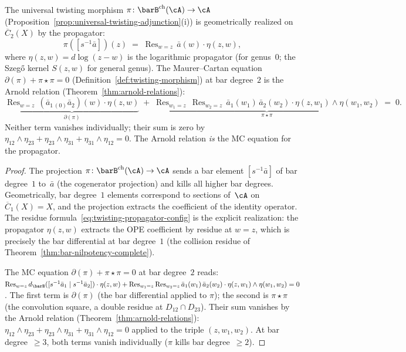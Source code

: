 \begin{proposition}
\label{prop:twisting-morphism-propagator}
The universal twisting morphism
$\pi\colon \barB^{\mathrm{ch}}(\cA) \to \cA$
\textup{(}Proposition~\textup{\ref{prop:universal-twisting-adjunction}(i))}
is geometrically realized on~$\overline{C}_2(X)$ by the propagator:
\begin{equation}\label{eq:twisting-propagator-config}
\pi([s^{-1}\bar{a}])(z)
\;=\;
\operatorname{Res}_{w=z}\, \bar{a}(w) \cdot \eta(z, w),
\end{equation}
where $\eta(z,w) = d\log(z - w)$ is the logarithmic propagator
\textup{(}for genus~$0$; the Szeg\H{o} kernel $S(z,w)$ for
general genus\textup{)}.  The Maurer--Cartan equation
$\partial(\pi) + \pi \star \pi = 0$
\textup{(}Definition~\textup{\ref{def:twisting-morphism})} at bar
degree~$2$ is the Arnold relation
\textup{(}Theorem~\textup{\ref{thm:arnold-relations})}:
\[
\underbrace{\operatorname{Res}_{w=z}\,
(\bar{a}_{1\,(0)}\bar{a}_2)(w) \cdot \eta(z,w)}_{\partial(\pi)}
\;+\;
\underbrace{\operatorname{Res}_{w_1=z}\,
\operatorname{Res}_{w_2=z}\,
\bar{a}_1(w_1)\, \bar{a}_2(w_2)
\cdot \eta(z,w_1) \wedge \eta(w_1,w_2)}_{\pi \star \pi}
\;=\; 0.
\]
Neither term vanishes individually; their sum is zero by
$\eta_{12} \wedge \eta_{23} + \eta_{23} \wedge \eta_{31}
+ \eta_{31} \wedge \eta_{12} = 0$.
The Arnold relation \emph{is} the MC equation for the propagator.
\end{proposition}

\begin{proof}
The projection $\pi\colon \barB^{\mathrm{ch}}(\cA) \to \cA$ sends
a bar element $[s^{-1}\bar{a}]$ of bar degree~$1$ to~$\bar{a}$
(the cogenerator projection) and kills all higher bar degrees.
Geometrically, bar degree~$1$ elements correspond to sections
of~$\cA$ on $\overline{C}_1(X) = X$, and the projection extracts
the coefficient of the identity operator.  The residue
formula~\eqref{eq:twisting-propagator-config} is the explicit
realization: the propagator $\eta(z,w)$ extracts the OPE
coefficient by residue at $w = z$, which is precisely the bar
differential at bar degree~$1$
(the collision residue of
Theorem~\ref{thm:bar-nilpotency-complete}).

The MC equation $\partial(\pi) + \pi \star \pi = 0$ at bar
degree~$2$ reads:
$\operatorname{Res}_{w=z} d_{\barB}([s^{-1}\bar{a}_1 \mid
s^{-1}\bar{a}_2]) \cdot \eta(z,w)
+ \operatorname{Res}_{w_1=z} \operatorname{Res}_{w_2=z}
\bar{a}_1(w_1)\,\bar{a}_2(w_2) \cdot
\eta(z,w_1) \wedge \eta(w_1,w_2) = 0$.
The first term is $\partial(\pi)$ (the bar differential applied to
$\pi$); the second is $\pi \star \pi$ (the convolution square,
a double residue at $D_{12} \cap D_{23}$).  Their sum vanishes by
the Arnold relation (Theorem~\ref{thm:arnold-relations}):
$\eta_{12} \wedge \eta_{23} + \eta_{23} \wedge \eta_{31}
+ \eta_{31} \wedge \eta_{12} = 0$ applied to the triple
$(z, w_1, w_2)$.
At bar degree~$\geq 3$, both terms vanish individually
($\pi$ kills bar degree~$\geq 2$).
\end{proof}

